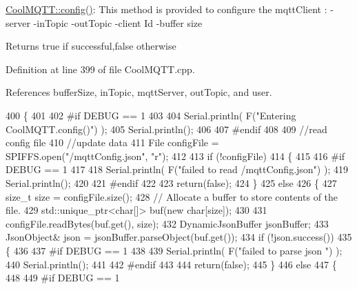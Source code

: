\hyperlink{classCoolMQTT_a6571671781a505feca9a8a56e256c6bc}{Cool\+M\+Q\+T\+T\+::config()}\+: This method is provided to configure the mqtt\+Client \+: -\/server -\/in\+Topic -\/out\+Topic -\/client Id -\/buffer size

\begin{DoxyReturn}{Returns}
true if successful,false otherwise 
\end{DoxyReturn}


Definition at line 399 of file Cool\+M\+Q\+T\+T.\+cpp.



References buffer\+Size, in\+Topic, mqtt\+Server, out\+Topic, and user.


\begin{DoxyCode}
400 \{
401 
402 \textcolor{preprocessor}{#if DEBUG == 1 }
403 
404     Serial.println( F(\textcolor{stringliteral}{"Entering CoolMQTT.config()"}) );
405     Serial.println();
406 
407 \textcolor{preprocessor}{#endif}
408 
409     \textcolor{comment}{//read config file}
410     \textcolor{comment}{//update data}
411     File configFile = SPIFFS.open(\textcolor{stringliteral}{"/mqttConfig.json"}, \textcolor{stringliteral}{"r"});
412 
413     \textcolor{keywordflow}{if} (!configFile) 
414     \{
415     
416 \textcolor{preprocessor}{    #if DEBUG == 1 }
417 
418         Serial.println( F(\textcolor{stringliteral}{"failed to read /mqttConfig.json"}) );
419         Serial.println();
420 
421 \textcolor{preprocessor}{    #endif}
422 
423         \textcolor{keywordflow}{return}(\textcolor{keyword}{false});
424     \}
425     \textcolor{keywordflow}{else}
426     \{
427         \textcolor{keywordtype}{size\_t} size = configFile.size();
428         \textcolor{comment}{// Allocate a buffer to store contents of the file.}
429         std::unique\_ptr<char[]> buf(\textcolor{keyword}{new} \textcolor{keywordtype}{char}[size]);
430 
431         configFile.readBytes(buf.get(), size);
432         DynamicJsonBuffer jsonBuffer;
433         JsonObject& json = jsonBuffer.parseObject(buf.get());
434         \textcolor{keywordflow}{if} (!json.success()) 
435         \{
436         
437 \textcolor{preprocessor}{        #if DEBUG == 1 }
438 
439             Serial.println( F(\textcolor{stringliteral}{"failed to parse json "}) );
440             Serial.println();
441         
442 \textcolor{preprocessor}{        #endif}
443             
444             \textcolor{keywordflow}{return}(\textcolor{keyword}{false});
445         \} 
446         \textcolor{keywordflow}{else}
447         \{
448         
449 \textcolor{preprocessor}{        #if DEBUG == 1 }

\end{DoxyCode}
